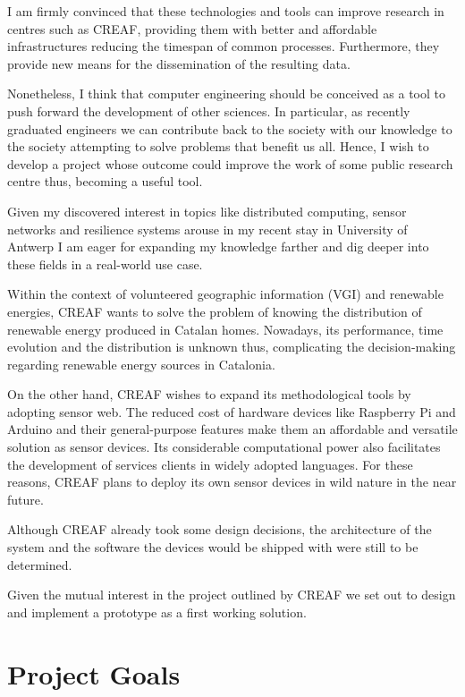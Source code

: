 I am firmly convinced that these technologies and tools can improve research in centres such as CREAF, providing them with better and affordable infrastructures reducing the timespan of common processes. Furthermore, they provide new means for the dissemination of the resulting data.

Nonetheless, I think that computer engineering should be conceived as a tool to push forward the development of other sciences. In particular, as recently graduated engineers we can contribute back to the society with our knowledge to the society attempting to solve problems that benefit us all. Hence, I wish to develop a project whose outcome could improve the work of some public research centre thus, becoming a useful tool.

Given my discovered interest in topics like distributed computing, sensor networks and resilience systems arouse in my recent stay in University of Antwerp I am eager for expanding my knowledge farther and dig deeper into these fields in a real-world use case.

Within the context of volunteered geographic information (VGI) and renewable energies, CREAF wants to solve the problem of knowing the distribution of renewable energy produced in Catalan homes. Nowadays, its performance, time evolution and the distribution is unknown thus, complicating the decision-making regarding renewable energy sources in Catalonia.

On the other hand, CREAF wishes to expand its methodological tools by adopting sensor web. The reduced cost of hardware devices like Raspberry Pi and Arduino  and their general-purpose features make them an affordable and versatile solution as sensor devices. Its considerable computational power also facilitates the development of services clients in widely adopted languages. For these reasons, CREAF plans to deploy its own sensor devices in wild nature in the near future. 

Although CREAF already took some design decisions, the architecture of the system and the software the devices would be shipped with were still to be determined.

Given the mutual interest in the project outlined by CREAF we set out to design and implement a prototype as a first working solution.

\section{Project Goals}

